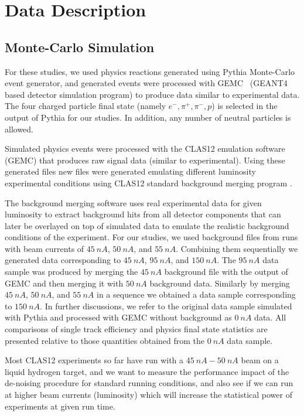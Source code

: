 \section{Data Description}

\subsection{Monte-Carlo Simulation}

For these studies, we used physics reactions generated using Pythia Monte-Carlo~\cite{Pythia:2022} event generator, and generated events were processed with GEMC~\cite{gemc:2022} (GEANT4~\cite{geant4:2022} based detector simulation program) to produce data similar to experimental data. The four charged particle final state (namely $e^-,\pi^+,\pi^-,p$) is selected in the output of Pythia for our studies.
In addition, any number of neutral particles is allowed.

Simulated physics events were processed with the CLAS12 emulation software (GEMC) that produces raw signal data (similar to experimental).
Using these generated files new files were generated emulating different luminosity experimental conditions using CLAS12 standard background merging program \cite{Stepanyan:2020bg}. 

The background merging software uses real experimental data for given luminosity to extract background hits from all detector components that can later be overlayed on top of simulated data to emulate the realistic background conditions of the experiment. For our studies, we used background files from runs with beam currents of $45~nA$, $50~nA$, and $55~nA$. Combining them sequentially we generated data corresponding to $45~nA$, $95~nA$, and $150~nA$. The $95~nA$ data sample was produced by merging the $45~nA$ background file with the output of GEMC and then merging it with $50~nA$ background data. Similarly by merging $45~nA$, $50~nA$, and $55~nA$ in a sequence we obtained a data sample corresponding to $150~nA$. In further discussions, we refer to the original data sample simulated with Pythia and processed with GEMC without background as $0~nA$ data. All comparisons of single track efficiency and physics final state statistics 
are presented relative to those quantities obtained from the $0~nA$ data sample.

Most CLAS12 experiments so far have run with a $45~nA-50~nA$ beam on a liquid hydrogen target, and we want to measure the performance impact of the de-noising procedure for standard running conditions, and also see if we can run at higher beam currents (luminosity) which will increase the statistical power of experiments at given run time.

